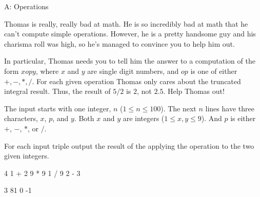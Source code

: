 \begin{problem}{A: Operations}

Thomas is really, really bad at math.
He is so incredibly bad at math that he can't compute simple operations.
However, he is a pretty handsome guy and his charisma roll was high, so he's managed to convince you to help him out.

In particular, Thomas needs you to tell him the answer to a computation of the form $x {op} y$, where $x$ and $y$ are single digit numbers, and ${op}$ is one of either $+, -, *, /$.
For each given operation Thomas only cares about the truncated integral result.
Thus, the result of $5 / 2$ is $2$, not $2.5$.
Help Thomas out!

\end{problem}

\begin{formalin}
The input starts with one integer, $n$ ($1 \leq n \leq 100$).
The next $n$ lines have three characters, $x$, $p$, and $y$.
Both $x$ and $y$ are integers ($1 \leq x, y \leq 9$).
And $p$ is either $+$, $-$, $*$, or $/$.
\end{formalin}

\begin{formalout}
For each input triple output the result of the applying the operation to the two given integers.
\end{formalout}

\begin{datain}
4
1 + 2
9 * 9
1 / 9
2 - 3
\end{datain}

\begin{dataout}
3
81
0
-1
\end{dataout}

